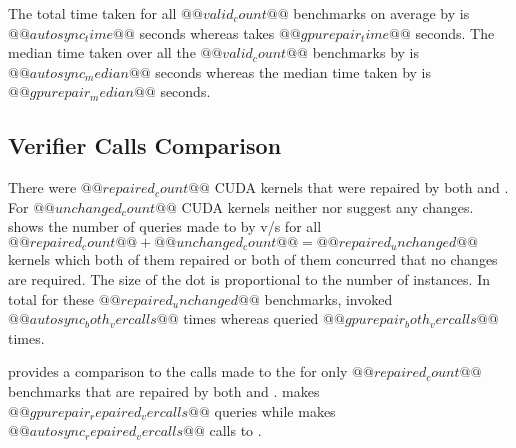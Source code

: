 The total time taken for all $@@valid_count@@$ benchmarks on average by \autosync is $@@autosync_time@@$ seconds whereas \tool takes $@@gpurepair_time@@$ seconds. The median time taken over all the $@@valid_count@@$ benchmarks by \autosync is $@@autosync_median@@$ seconds whereas the median time taken by \tool is $@@gpurepair_median@@$ seconds.



\subsection{Verifier Calls Comparison}
There were $@@repaired_count@@$ CUDA kernels that were repaired by both \tool and \autosync. For $@@unchanged_count@@$ CUDA kernels neither \tool nor \autosync suggest any changes.  shows the number of queries made to \verifier by \autosync v/s \tool for all $@@repaired_count@@+@@unchanged_count@@=@@repaired_unchanged@@$ kernels which both of them repaired or both of them concurred that no changes are required. The size of the dot is proportional to the number of instances. In total for these $@@repaired_unchanged@@$ benchmarks, \autosync invoked \verifier $@@autosync_both_vercalls@@$ times whereas \tool queried \verifier $@@gpurepair_both_vercalls@@$ times.

 provides a comparison to the calls made to the \verifier for only $@@repaired_count@@$ benchmarks that are repaired by both \tool and \autosync. \tool makes $@@gpurepair_repaired_vercalls@@$ queries while \autosync makes $@@autosync_repaired_vercalls@@$ calls to \verifier.


